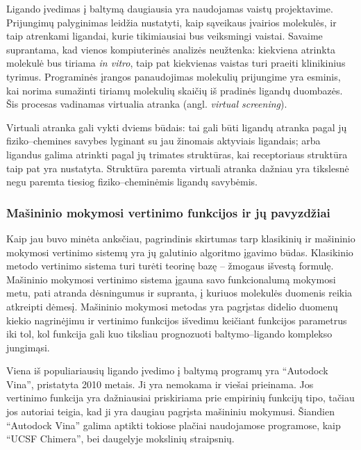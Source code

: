 Ligando įvedimas į baltymą daugiausia yra naudojamas vaistų projektavime. Prijungimų palyginimas leidžia nustatyti, kaip sąveikaus įvairios molekulės, ir taip atrenkami ligandai, kurie tikimiausiai bus veiksmingi vaistai. Savaime suprantama, kad vienos kompiuterinės analizės neužtenka: kiekviena atrinkta molekulė bus tiriama \textit{in vitro}, taip pat kiekvienas vaistas turi praeiti klinikinius tyrimus. Programinės įrangos panaudojimas molekulių prijungime yra esminis, kai norima sumažinti tiriamų molekulių skaičių iš pradinės ligandų duombazės.\cite{pereira_boosting_2016} Šis procesas vadinamas virtualia atranka (angl. \textit{virtual screening}). 

Virtuali atranka gali vykti dviems būdais: tai gali būti ligandų atranka pagal jų fiziko--chemines savybes lyginant su jau žinomais aktyviais ligandais; arba ligandus galima atrinkti pagal jų trimates struktūras, kai receptoriaus struktūra taip pat yra nustatyta. Struktūra paremta virtuali atranka dažniau yra tikslesnė negu paremta tiesiog fiziko--cheminėmis ligandų savybėmis.\cite{pereira_boosting_2016}

\subsubsection{Mašininio mokymosi vertinimo funkcijos ir jų pavyzdžiai}
\label{sec:vertinimo_funkciju_pavyzdziai}

Kaip jau buvo minėta anksčiau, pagrindinis skirtumas tarp klasikinių ir mašininio mokymosi vertinimo sistemų yra jų galutinio algoritmo įgavimo būdas. Klasikinio metodo vertinimo sistema turi turėti teorinę bazę -- žmogaus išvestą formulę. Mašininio mokymosi vertinimo sistema įgauna savo funkcionalumą mokymosi metu, pati atranda dėsningumus ir supranta, į kuriuos molekulės duomenis reikia atkreipti dėmesį. Mašininio mokymosi metodas yra pagrįstas didelio duomenų kiekio nagrinėjimu ir vertinimo funkcijos išvedimu keičiant funkcijos parametrus iki tol, kol funkcija gali kuo tiksliau prognozuoti baltymo--ligando komplekso jungimąsi. 

Viena iš populiariausių ligando įvedimo į baltymą programų yra \enquote{Autodock Vina}\cite{trott_autodock_2010}, pristatyta 2010 metais. Ji yra nemokama ir viešai prieinama. Jos vertinimo funkcija yra dažniausiai priskiriama prie empirinių funkcijų tipo, tačiau jos autoriai teigia, kad ji yra daugiau pagrįsta mašininiu mokymusi. Šiandien \enquote{Autodock Vina} galima aptikti tokiose plačiai naudojamose programose, kaip \enquote{UCSF Chimera}, bei daugelyje mokslinių straipsnių.

